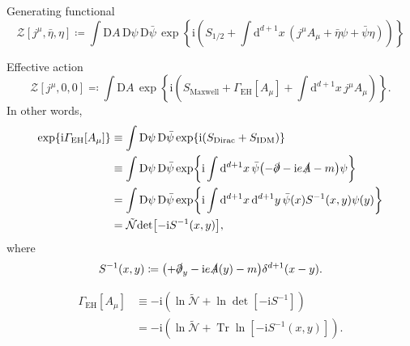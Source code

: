 \documentclass[12pt]{article}
\newcommand\mi{\mathrm{i}} %
\newcommand\dif{\mathrm{d}}
\newcommand\Dif{\mathrm{D}}
\DeclareMathOperator{\Tr}{Tr}
\newcommand{\rbr}[1]{{\left(#1\right)}}
\newcommand{\rfun}[2]{{#1}\mathopen{}\left(#2\right)\mathclose{}}
\newcommand{\sfun}[2]{{#1}\mathopen{}\left[#2\right]\mathclose{}}
\newcommand{\cfun}[2]{{#1}\mathopen{}\left\{#2\right\}\mathclose{}}
\begin{document}
Generating functional
\begin{equation}
\sfun{\mathcal{Z}}{j^\mu, \bar\eta, \eta} \coloneqq
\int\Dif A\,\Dif\psi\,\Dif\bar\psi\,\cfun{\exp}{\mi\rbr{S_{1/2}
+\int\dif^{d+1} x\,\rbr{j^\mu A_\mu + \bar\eta \psi+\bar\psi \eta}}}
\end{equation}

Effective action
\begin{equation}
\sfun{\mathcal{Z}}{j^\mu, 0, 0} \eqqcolon
\int\Dif A\,\cfun{\exp}{\mi\rbr{S_\text{Maxwell} + 
\sfun{\varGamma_\text{EH}}{A_\mu}
+\int\dif^{d+1} x \,j^\mu A_\mu}}.
\end{equation}
In other words,
\begin{align}
\cfun{\exp}{\mi\sfun{\varGamma_\text{EH}}{A_\mu}} &\equiv \int
\Dif\psi\,\Dif\bar\psi\,\cfun{\exp}{\mi\rbr{S_\text{Dirac}+S_\text{IDM}}}
\nonumber \\
&\equiv \int\Dif\psi\,\Dif\bar\psi\,\cfun{\exp}{\mi\int\dif^{d+1} x\,
\bar{\psi} \rbr{-\slashed{\partial}-\mi e \slashed{A} - m}\psi}
\nonumber \\
&= \int\Dif\psi\,\Dif\bar\psi\,\cfun{\exp}{\mi\int\dif^{d+1} x\,\dif^{d+1} y\,
\rfun{\bar\psi}{x} \rfun{S^{-1}}{x, y} \rfun{\psi}{y}}
\nonumber \\
&= \tilde{\mathcal{N}}\sfun{\det}{-\mi \rfun{S^{-1}}{x, y}},
\end{align}
where
\begin{equation}
\rfun{S^{-1}}{x, y} \coloneqq \rbr{+\slashed{\partial}_y-\mi e 
\rfun{\slashed{A}}{y} - m}\rfun{\delta^{d+1}}{x-y}.
\end{equation}

\begin{align}
\sfun{\varGamma_\text{EH}}{A_\mu} &\equiv
-\mi\rbr{\ln\tilde{\mathcal{N}} + \ln \sfun{\det}{-\mi S^{-1}}} 
\nonumber \\
&= -\mi \rbr{\ln\tilde{\mathcal{N}} + \Tr \sfun{\ln}{-\mi \rfun{S^{-1}}{x, 
y}}}.
\end{align}
\end{document}

